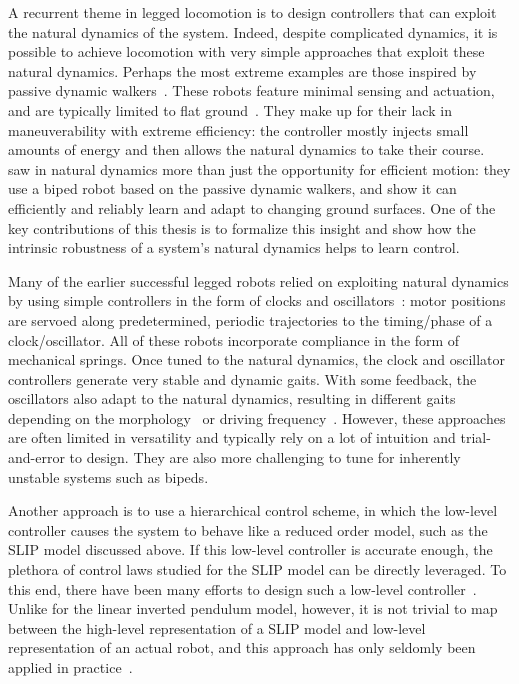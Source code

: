A recurrent theme in legged locomotion is to design controllers that can exploit the natural dynamics of the system. Indeed, despite complicated dynamics, it is possible to achieve locomotion with very simple approaches that exploit these natural dynamics.
Perhaps the most extreme examples are those inspired by passive dynamic walkers~\cite{mcgeer1990passive}. These robots feature minimal sensing and actuation, and are typically limited to flat ground~\cite{bhounsule2012design,wisse2006design}. They make up for their lack in maneuverability with extreme efficiency: the controller mostly injects small amounts of energy and then allows the natural dynamics to take their course.~\textcite{tedrake2005learning} saw in natural dynamics more than just the opportunity for efficient motion: they use a biped robot based on the passive dynamic walkers, and show it can efficiently and reliably learn and adapt to changing ground surfaces. One of the key contributions of this thesis is to formalize this insight and show how the intrinsic robustness of a system's natural dynamics helps to learn control. \par
Many of the earlier successful legged robots relied on exploiting natural dynamics by using simple controllers in the form of clocks and oscillators~\cite{sprowitz2013towards,buchli2006resonance,altendorfer2001rhex,owaki2013simple}: motor positions are servoed along predetermined, periodic trajectories to the timing/phase of a clock/oscillator. All of these robots incorporate compliance in the form of mechanical springs. Once tuned to the natural dynamics, the clock and oscillator controllers generate very stable and dynamic gaits. With some feedback, the oscillators also adapt to the natural dynamics, resulting in different gaits depending on the morphology~\cite{owaki2013simple} or driving frequency~\cite{owaki2013simple,owaki2017quadruped}. %
However, these approaches are often limited in versatility and typically rely on a lot of intuition and trial-and-error to design. They are also more challenging to tune for inherently unstable systems such as bipeds. \par
Another approach is to use a hierarchical control scheme, in which the low-level controller causes the system to behave like a reduced order model, such as the SLIP model discussed above.
If this low-level controller is accurate enough, the plethora of control laws studied for the SLIP model can be directly leveraged. To this end, there have been many efforts to design such a low-level controller~\cite{hutter2010slip,poulakakis2009spring,wensing2013high}. Unlike for the linear inverted pendulum model, however, it is not trivial to map between the high-level representation of a SLIP model and low-level representation of an actual robot, and this approach has only seldomly been applied in practice~\cite{martin2017experimental}.
